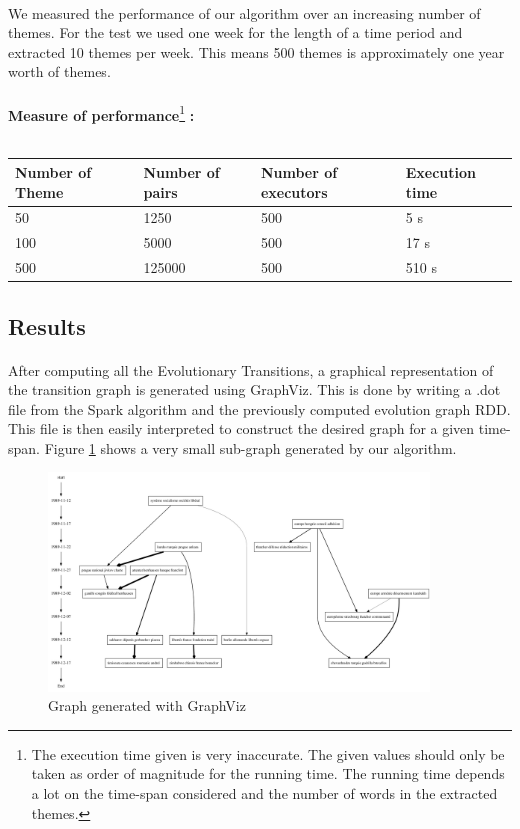 \paragraph{}
We measured the performance of our algorithm over an increasing number of themes. For the test we used one week for the length of a time period and extracted 10 themes per week. This means 500 themes is approximately one year worth of themes.

\paragraph{}
\textbf{Measure of performance}\footnote{The execution time given is very inaccurate. The given values should only be taken as order of magnitude for the running time. The running time depends a lot on the time-span considered and the number of words in the extracted themes.}\textbf{ :}~\\
~\newline
\begin{tabular}{l|l|l|l}
\label{tab:quadratic}
Number of Theme & Number of pairs & Number of executors & Execution time \\ \hline
50 & 1250 & 500 & 5 s \\
100 & 5000 & 500 & 17 s \\
500 & 125000 & 500 & 510 s \\
\end{tabular}

\subsection{Results}
\label{sec:EvoGraphResults}

\paragraph{}
After computing all the Evolutionary Transitions, a graphical representation of the transition graph is generated using GraphViz. This is done by writing a .dot file from the Spark algorithm and the previously computed evolution graph RDD. This file is then easily interpreted to construct the desired graph for a given time-span. Figure \ref{fig:graph} shows a very small sub-graph generated by our algorithm. 

\begin{figure}[H]
\begin{center}
\includegraphics[width=0.9\textwidth]{images/graph.png}
\caption{Graph generated with GraphViz}
\label{fig:graph}
\end{center}
\end{figure}
